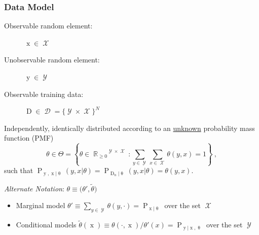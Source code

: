 \documentclass[aspectratio=169]{beamer}
\DeclareMathOperator{\xrm}{\mathrm{x}}
\DeclareMathOperator{\yrm}{\mathrm{y}}
\DeclareMathOperator{\Drm}{\mathrm{D}}
\DeclareMathOperator{\Prm}{\mathrm{P}}
\DeclareMathOperator{\Xcal}{\mathcal{X}}
\DeclareMathOperator{\Ycal}{\mathcal{Y}}
\DeclareMathOperator{\Dcal}{\mathcal{D}}
\DeclareMathOperator{\Rbb}{\mathbb{R}}
\begin{document}
\begin{frame}
\frametitle{Data Model}

\begin{description}
\item[Observable random element:] $\xrm \in \Xcal$
\item[Unobservable random element:] $\yrm \in \Ycal$
\item[Observable training data:] $\Drm \in \Dcal = \{\Ycal \times \Xcal\}^N$
\end{description}

\vspace{0.5em}

Independently, identically distributed according to an \underline{unknown} probability mass function (PMF) 
\begin{equation*}
\theta \in \Theta = \left\{ \theta \in {\Rbb_{\geq 0}}^{\Ycal \times \Xcal}: \sum_{y \in \Ycal} \sum_{x \in \Xcal} \theta(y,x) = 1 \right\} \ ,
\end{equation*}
such that $\Prm_{\yrm,\xrm | \uptheta}(y,x | \theta) = \Prm_{\Drm_n | \uptheta}(y,x | \theta) = \theta(y,x)$.

\hrulefill

\vspace{0.5em}
\textit{Alternate Notation}: $\theta \equiv \big( \theta',\tilde{\theta} \big)$
\begin{itemize}
\item Marginal model $\theta' \equiv \sum_{y \in \Ycal} \theta(y,\cdot) = \Prm_{\xrm | \uptheta}$ over the set $\Xcal$ 
\item Conditional models $\tilde{\theta}(\xrm) \equiv \theta(\cdot,\xrm) / \theta'(x) = \Prm_{\yrm | \xrm,\uptheta}$ over the set $\Ycal$
\end{itemize}


\end{frame}
\end{document}
